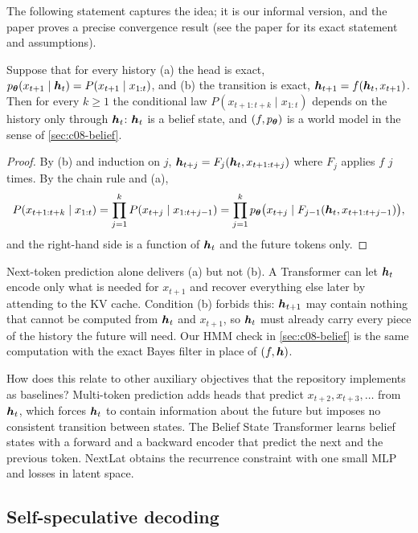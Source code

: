 The following statement captures the idea; it is our informal version, and the paper proves a
precise convergence result (see the paper for its exact statement and assumptions).
\begin{proposition}\label{prop:c08-belief}
Suppose that for every history (a) the head is exact,
$p_{\bm{\theta}}(x_{t+1}\mid\bm{h}_t)=P(x_{t+1}\mid x_{1:t})$, and (b) the transition is exact,
$\bm{h}_{t+1}=f(\bm{h}_t,x_{t+1})$. Then for every $k\ge1$ the conditional law
$P(x_{t+1:t+k}\mid x_{1:t})$ depends on the history only through $\bm{h}_t$: $\bm{h}_t$ is a belief state,
and $(f,p_{\bm{\theta}})$ is a world model in the sense of \cref{sec:c08-belief}.
\end{proposition}
\begin{proof}
By (b) and induction on $j$, $\bm{h}_{t+j}=F_j(\bm{h}_t,x_{t+1:t+j})$ where $F_j$ applies $f$ $j$ times.
By the chain rule and (a),
\[
  P(x_{t+1:t+k}\mid x_{1:t})=\prod_{j=1}^{k}P(x_{t+j}\mid x_{1:t+j-1})
  =\prod_{j=1}^{k}p_{\bm{\theta}}\bigl(x_{t+j}\mid F_{j-1}(\bm{h}_t,x_{t+1:t+j-1})\bigr),
\]
and the right-hand side is a function of $\bm{h}_t$ and the future tokens only.
\end{proof}
Next-token prediction alone delivers (a) but not (b). A Transformer can let $\bm{h}_t$ encode only what
is needed for $x_{t+1}$ and recover everything else later by attending to the KV cache. Condition (b)
forbids this: $\bm{h}_{t+1}$ may contain nothing that cannot be computed from $\bm{h}_t$ and $x_{t+1}$, so
$\bm{h}_t$ must already carry every piece of the history the future will need. Our HMM check in
\cref{sec:c08-belief} is the same computation with the exact Bayes filter in place of $(f,\bm{h})$.

How does this relate to other auxiliary objectives that the repository implements as baselines?
Multi-token prediction \citep{c08-gloeckle2024mtp} adds heads that predict $x_{t+2},x_{t+3},\dots$
from $\bm{h}_t$, which forces $\bm{h}_t$ to contain information about the future but imposes no
consistent transition between states. The Belief State Transformer \citep{c08-hu2025bst} learns
belief states with a forward and a backward encoder that predict the next and the previous token.
NextLat obtains the recurrence constraint with one small MLP and losses in latent space.

\subsection{Self-speculative decoding}\label{sec:c08-nextlat-spec}

